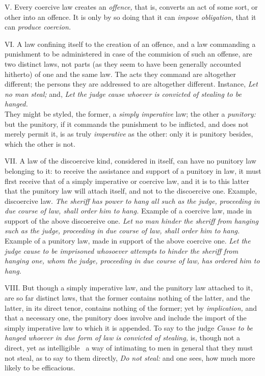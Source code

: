 \documentclass[12pt]{report}
\begin{document}
V. Every coercive law creates an \emph{offence,} that is, converts an
act of some sort, or other into an offence. It is only by so doing that
it can \emph{impose obligation,} that it can \emph{produce coercion.}

VI. A law confining itself to the creation of an offence, and a law
commanding a punishment to be administered in case of the commision of
such an offense, are two distinct laws, not parts (as they seem to have
been generally accounted hitherto) of one and the same law. The acts
they command are altogether different; the persons they are addressed to
are altogether different. Instance, \emph{Let no man steal;} and,
\emph{Let the judge cause whoever is convicted of stealing to be
hanged.}\\
They might be styled, the former, a \emph{simply imperative} law; the
other a \emph{punitory:} but the punitory, if it commands the punishment
to be inflicted, and does not merely permit it, is as truly
\emph{imperative} as the other: only it is punitory besides, which the
other is not.

VII. A law of the discoercive kind, considered in itself, can have no
punitory law belonging to it: to receive the assistance and support of a
punitory in law, it must flrst receive that of a simply imperative or
coercive law, and it is to this latter that the punitory law will attach
itself, and not to the discoercive one. Example, discoercive law.
\emph{The sheriff has power to hang all such as the judge, proceeding in
due course of law, shall order him to hang.} Example of a coercive law,
made in support of the above discoereive one. \emph{Let no man hinder
the sheriff from hanging such as the judge, proceeding in due course of
law, shall order him to hang.} Example of a punitory law, made in
support of the above coercive one. \emph{Let the judge cause to be
imprisoned whosoever attempts to hinder the sheriff from hanging one,
whom the judge, proceeding in due course of law, has ordered him to
hang.}

VIII. But though a simply imperative law, and the punitory law attached
to it, are so far distinct laws, that the former contains nothing of the
latter, and the latter, in its direct tenor, contains nothing of the
former; yet by \emph{implication,} and that a necessary one, the
punitory does involve and include the import of the simply imperative
law to which it is appended. To say to the judge \emph{Cause to be
hanged whoever in due form of law is convicted of stealing,} is, though
not a direct, yet as intelligible~ a way of intimating to men in general
that they must not steal, as to say to them directly, \emph{Do not
steal:} and one sees, how much more likely to be efficacious.
\end{document}

